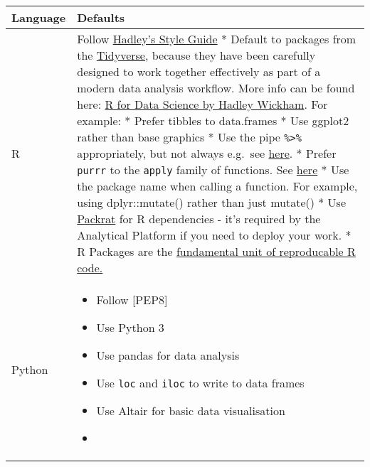\documentclass[]{book}
\providecommand{\tightlist}{%
  \setlength{\itemsep}{0pt}\setlength{\parskip}{0pt}}
\begin{document}
\begin{longtable}[]{@{}ll@{}}
\toprule
\begin{minipage}[b]{0.27\columnwidth}\raggedright
Language\strut
\end{minipage} & \begin{minipage}[b]{0.67\columnwidth}\raggedright
Defaults\strut
\end{minipage}\tabularnewline
\midrule
\endhead
\begin{minipage}[t]{0.27\columnwidth}\raggedright
R\strut
\end{minipage} & \begin{minipage}[t]{0.67\columnwidth}\raggedright
Follow \href{http://adv-r.had.co.nz/Style.html}{Hadley's Style Guide}
* Default to packages from the \href{http://tidyverse.org/}{Tidyverse}, because they have been carefully designed to work together effectively as part of a modern data analysis workflow. More info can be found here: \href{http://r4ds.had.co.nz}{R for Data Science by Hadley Wickham}. For example:
* Prefer tibbles to data.frames
* Use ggplot2 rather than base graphics
* Use the pipe \texttt{\%\textgreater{}\%} appropriately, but not always e.g.~see \href{https://twitter.com/hadleywickham/status/603883121197514752}{here}.
* Prefer \texttt{purrr} to the \texttt{apply} family of functions. See \href{http://r4ds.had.co.nz/iteration.html\#the-map-functions}{here}
* Use the package name when calling a function. For example, using dplyr::mutate() rather than just mutate()
* Use \href{https://rstudio.github.io/packrat/}{Packrat} for R dependencies - it's required by the Analytical Platform if you need to deploy your work.
* R Packages are the \href{http://r-pkgs.had.co.nz/}{fundamental unit of reproducable R code.}\strut
\end{minipage}\tabularnewline
\begin{minipage}[t]{0.27\columnwidth}\raggedright
Python\strut
\end{minipage} & \begin{minipage}[t]{0.67\columnwidth}\raggedright
\begin{itemize}
\tightlist
\item
  Follow {[}PEP8{]}
\item
  Use Python 3
\item
  Use pandas for data analysis
\item
  Use \texttt{loc} and \texttt{iloc} to write to data frames
\item
  Use Altair for basic data visualisation
\item

\end{itemize}
\end{minipage}
\end{longtable}
\end{document}
